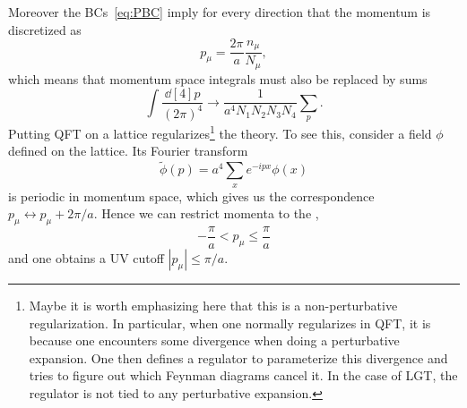 Moreover the BCs~\eqref{eq:PBC} imply for every direction
that the momentum is discretized as
\begin{equation}
  p_\mu=\frac{2\pi}{a}\frac{n_\mu}{N_\mu},
\end{equation}
which means that momentum space integrals must also be replaced by
sums
\begin{equation}
  \int\frac{\dd[4]{p}}{(2\pi)^4}\to
  \frac{1}{a^4N_1N_2N_3N_4}\sum_p. 
\end{equation}
Putting QFT on a lattice regularizes\footnote{Maybe it is worth
emphasizing here that this is a non-perturbative regularization. 
In particular, when one normally regularizes in QFT, it is because
one encounters some divergence when doing a perturbative
expansion. One then defines a regulator to parameterize this
divergence and tries to figure out which Feynman diagrams 
cancel it. In the case of LGT, the regulator is not tied to
any perturbative expansion.} the theory. 
To see this, consider a field $\phi$ defined on the lattice. 
Its Fourier transform
\begin{equation}\label{eq:fourierLat}
  \widetilde{\phi}(p)=a^4\sum_xe^{-ipx}\phi(x)
\end{equation}
is periodic in momentum space, which gives us the correspondence
$p_\mu\leftrightarrow p_\mu+2\pi/a$. Hence we can restrict
momenta to the ,
\begin{equation}
 -\frac{\pi}{a}<p_\mu\le\frac{\pi}{a}
\end{equation}
and one obtains a UV cutoff $|p_\mu|\le\pi/a$.


